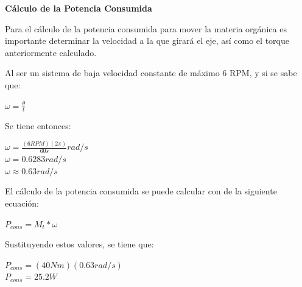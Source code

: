 \textbf{Cálculo de la Potencia Consumida}

Para el cálculo de la potencia consumida para mover la materia orgánica es importante determinar la velocidad a la que girará el eje, así como el torque anteriormente calculado.

Al ser un sistema de baja velocidad constante de máximo 6 RPM, y si se sabe que:

\begin{center}
  $\omega = \frac{\theta}{t} $  
\end{center}
Se tiene entonces:
\begin{center}
    $\omega = \frac{(6 RPM)(2 \pi)}{60 s} rad/s$ \\
    $\omega = 0.6283 rad/s $ \\
    $\omega \approx 0.63 rad/s$
\end{center}

El cálculo de la potencia consumida se puede calcular con de la siguiente ecuación:

\begin{center}
 $P_{cons}=M_t * \omega$   
\end{center}



Sustituyendo estos valores, se tiene que:
\begin{center}
    $P_{cons}=(40 Nm)(0.63 rad/s)$\\
    $P_{cons}=25.2 W$
\end{center}

